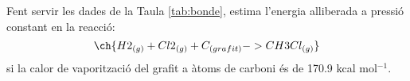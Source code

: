 \begin{exr}{}
Fent servir les dades de la Taula \ref{tab:bonde}, estima l'energia alliberada a pressió constant en la reacció:
\[
\ch{H2_{(g)}+Cl2_{(g)} + C_{(grafit)} -> CH3Cl_{(g)}}
\]
si la calor de vaporització del grafit a àtoms de carboni és de 170.9 kcal mol$^{-1}$.
\end{exr}
